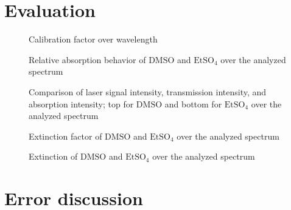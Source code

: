 \section{Evaluation}

\begin{figure}[!htb]
    \centering
    
    \caption{Calibration factor over wavelength}
    \label{fig:cal-factor}
\end{figure}

\begin{figure}[!htb]
    \centering
    
    \caption[Relative absorption spectra]{Relative absorption behavior of $\mathrm{DMSO}$ and $\mathrm{EtSO_4}$ over the analyzed spectrum}
    \label{fig:rel-absorption}
\end{figure}

\begin{figure}[!htb]
    \centering
    \begin{turn}{90}
        
    \end{turn}
    \caption[Comparison of origin, transmittive and absorbed signals]{Comparison of laser signal intensity, transmission intensity, and absorption intensity; top for $\mathrm{DMSO}$ and bottom for $\mathrm{EtSO_4}$ over the analyzed spectrum}
    \label{fig:laser-abs-trans}
\end{figure}

\begin{figure}[!htb]
    \centering
    
    \caption[Extinction factor over the spectrum]{Extinction factor of $\mathrm{DMSO}$ and $\mathrm{EtSO_4}$ over the analyzed spectrum}
    \label{fig:ext-factor}
\end{figure}

\begin{figure}[!htb]
    \centering
    
    \caption[Extinction over the spectrum]{Extinction of $\mathrm{DMSO}$ and $\mathrm{EtSO_4}$ over the analyzed spectrum}
    \label{fig:extinction}
\end{figure}

\section{Error discussion}